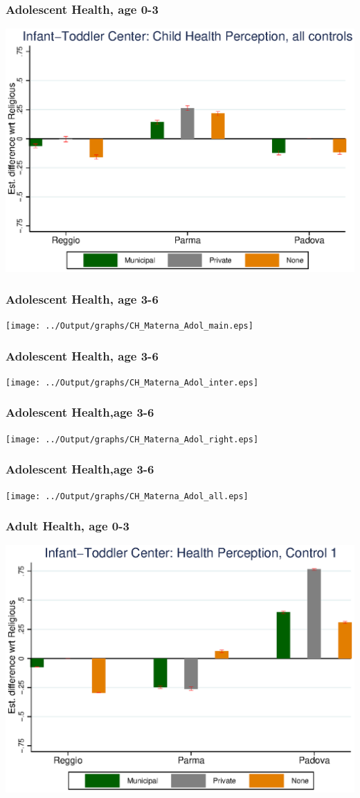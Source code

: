\documentclass{beamer}
\begin{document}
\begin{frame}\frametitle{Adolescent Health, age 0-3}
\center
\includegraphics[scale=0.7]{../Output/graphs/CH_Asilo_Adol_all.eps}
\end{frame}


\begin{frame}\frametitle{Adolescent Health, age 3-6}
\center
\texttt{[image: ../Output/graphs/CH\_Materna\_Adol\_main.eps]}
\end{frame}

\begin{frame}\frametitle{Adolescent Health, age 3-6}
\center
\texttt{[image: ../Output/graphs/CH\_Materna\_Adol\_inter.eps]}
\end{frame}

\begin{frame}\frametitle{Adolescent Health,age 3-6}
\center
\texttt{[image: ../Output/graphs/CH\_Materna\_Adol\_right.eps]}
\end{frame}

\begin{frame}\frametitle{Adolescent Health,age 3-6}
\center
\texttt{[image: ../Output/graphs/CH\_Materna\_Adol\_all.eps]}
\end{frame}

\begin{frame}\frametitle{Adult Health, age 0-3}
\center
\includegraphics[scale=0.7]{../Output/graphs/H_Asilo_Adult_main.eps}
\end{frame}
\end{document}
